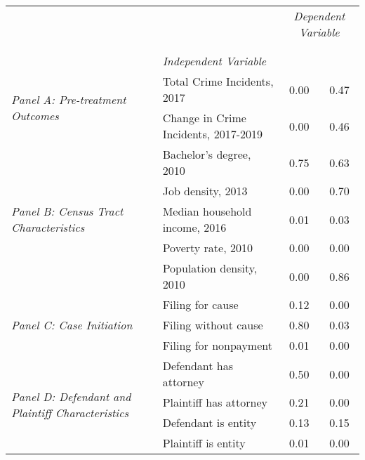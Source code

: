 \begin{tabular}{llcc}
\toprule
 &  & \multicolumn{2}{c}{\textit{Dependent Variable}} \\
\cline{3-4}
\\
 &  &  &  \\
 & \emph{Independent Variable} &  &  \\
\midrule
\multirow[c]{2}{3cm}{\textit{Panel A: Pre-treatment Outcomes}} & Total Crime Incidents, 2017 & 0.00 & 0.47 \\
 & Change in Crime Incidents, 2017-2019 & 0.00 & 0.46 \\
\cline{1-4}
\multirow[c]{5}{3cm}{\textit{Panel B: Census Tract Characteristics}} & Bachelor's degree, 2010 & 0.75 & 0.63 \\
 & Job density, 2013 & 0.00 & 0.70 \\
 & Median household income, 2016 & 0.01 & 0.03 \\
 & Poverty rate, 2010 & 0.00 & 0.00 \\
 & Population density, 2010 & 0.00 & 0.86 \\
\cline{1-4}
\multirow[c]{3}{3cm}{\textit{Panel C: Case Initiation}} & Filing for cause & 0.12 & 0.00 \\
 & Filing without cause & 0.80 & 0.03 \\
 & Filing for nonpayment & 0.01 & 0.00 \\
\cline{1-4}
\multirow[c]{4}{3cm}{\textit{Panel D: Defendant and Plaintiff Characteristics}} & Defendant has attorney & 0.50 & 0.00 \\
 & Plaintiff has attorney & 0.21 & 0.00 \\
 & Defendant is entity & 0.13 & 0.15 \\
 & Plaintiff is entity & 0.01 & 0.00 \\
\cline{1-4}
\bottomrule
\end{tabular}
